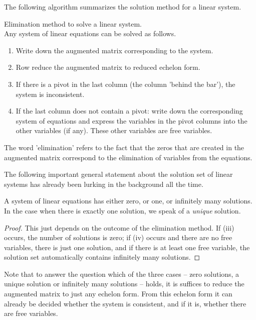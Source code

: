 The following algorithm summarizes the solution method for a linear system.

\begin{alg} Elimination method to solve a linear system. \\
Any system of linear equations can be solved as follows.

\begin{enumerate}[label=(\roman*)]
\item Write down the augmented matrix corresponding to the system.
\item Row reduce the augmented matrix to reduced echelon form.
\item If there is a pivot in the last column (the column 'behind the bar'), the system is inconsistent.
\item If the last column does not contain a pivot: write down the corresponding system of equations and express the variables in the pivot columns into the other variables (if any).  These other variables are free variables.
\end{enumerate}

The word 'elimination'  refers to the fact that the zeros that are created in the augmented matrix correspond to the elimination of variables from the equations.
\end{alg}

The following important general statement about the solution set of linear systems has already been lurking in the background all the time.

\begin{thm}
\label{Thm:LinSystems:ZeroOneInfSolutions}
A system of linear equations has either zero, or one, or infinitely many solutions.  In the case when there is exactly one solution, we speak of a \emph{unique} solution.
\end{thm}

\begin{proof}
This just depends on the outcome of the elimination method.
If (iii) occurs, the number of solutions is zero;  if (iv) occurs and there are no free variables, there is just one solution, and if there is at least one free variable, the solution set automatically contains infinitely many solutions.
\end{proof}


Note that to answer the question which of the three cases -- zero solutions, a  unique solution or infinitely many solutions -- holds, it is suffices to reduce the augmented matrix to just any echelon form.  From this echelon form it can already be decided whether the system is consistent, and if it is, whether there are free variables.



